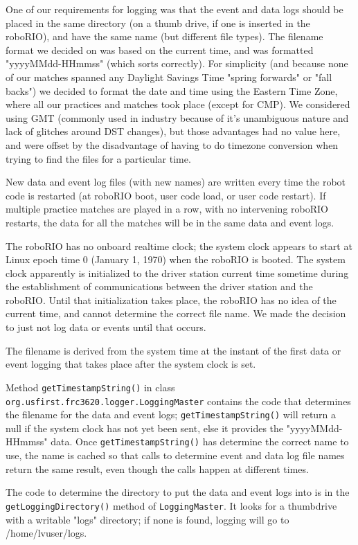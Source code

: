 \documentclass[]{article}
\begin{document}
One of our requirements for logging was that the event and data logs should be placed in the same directory (on a thumb drive, if one is inserted in the roboRIO), and have the same name (but different file types).
The filename format we decided on was based on the current time, and was formatted "yyyyMMdd-HHmmss" (which sorts correctly).
For simplicity (and because none of our matches spanned any Daylight Savings Time "spring forwards" or "fall backs") we decided to format the date and time using the Eastern Time Zone, where all our practices and matches took place (except for CMP). We considered using GMT (commonly used in industry because of it's unambiguous nature and lack of glitches around DST changes), but those advantages had no value here, and were offset by the disadvantage of having to do timezone conversion when trying to find the files for a particular time.

New data and event log files (with new names) are written every time the robot code is restarted (at roboRIO boot, user code load, or user code restart). If multiple practice matches are played in a row, with no intervening roboRIO restarts, the data for all the matches will be in the same data and event logs.

The roboRIO has no onboard realtime clock; the system clock appears to start at Linux epoch time 0 (January 1, 1970) when the roboRIO is booted.
The system clock apparently is initialized to the driver station current time sometime during the establishment of communications between the driver station and the roboRIO.
Until that initialization takes place, the roboRIO has no idea of the current time, and cannot determine the correct file name. We made the decision to just not log data or events until that occurs.

The filename is derived from the system time at the instant of the first data or event logging that takes place after the system clock is set. 

Method \texttt{getTimestampString()} in class \texttt{org.usfirst.frc3620.logger.LoggingMaster} contains the code that determines the filename for the data and event logs;
\texttt{getTimestampString()} will return a null if the system clock has not yet been sent, else it provides the "yyyyMMdd-HHmmss" data.
Once \texttt{getTimestampString()} has determine the correct name to use, the name is cached so that calls to determine event and data log file names return the same result, even though the calls happen at different times.

The code to determine the directory to put the data and event logs into is in the \texttt{getLoggingDirectory()} method of \texttt{LoggingMaster}.
It looks for a thumbdrive with a writable "logs" directory; if none is found, logging will go to /home/lvuser/logs.
\end{document}
